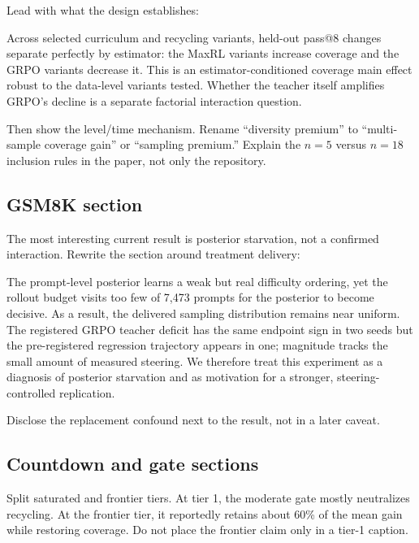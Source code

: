 \documentclass[11pt]{article}
\theoremstyle{definition}
\theoremstyle{remark}
\begin{document}
Lead with what the design establishes:

\begin{rewritebox}
Across selected curriculum and recycling variants, held-out pass@8 changes separate perfectly by estimator: the MaxRL variants increase coverage and the GRPO variants decrease it. This is an estimator-conditioned coverage main effect robust to the data-level variants tested. Whether the teacher itself amplifies GRPO's decline is a separate factorial interaction question.
\end{rewritebox}

Then show the level/time mechanism. Rename ``diversity premium'' to ``multi-sample coverage gain'' or ``sampling premium.'' Explain the $n=5$ versus $n=18$ inclusion rules in the paper, not only the repository.

\subsection{GSM8K section}

The most interesting current result is posterior starvation, not a confirmed interaction. Rewrite the section around treatment delivery:

\begin{rewritebox}
The prompt-level posterior learns a weak but real difficulty ordering, yet the rollout budget visits too few of 7,473 prompts for the posterior to become decisive. As a result, the delivered sampling distribution remains near uniform. The registered GRPO teacher deficit has the same endpoint sign in two seeds but the pre-registered regression trajectory appears in one; magnitude tracks the small amount of measured steering. We therefore treat this experiment as a diagnosis of posterior starvation and as motivation for a stronger, steering-controlled replication.
\end{rewritebox}

Disclose the replacement confound next to the result, not in a later caveat.

\subsection{Countdown and gate sections}

Split saturated and frontier tiers. At tier 1, the moderate gate mostly neutralizes recycling. At the frontier tier, it reportedly retains about 60\% of the mean gain while restoring coverage. Do not place the frontier claim only in a tier-1 caption.
\end{document}
